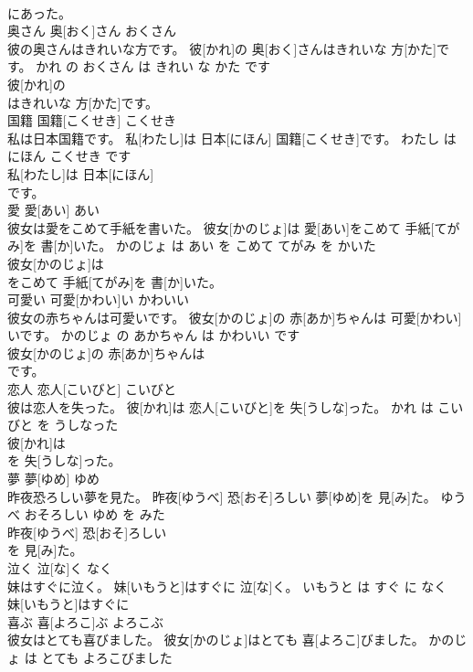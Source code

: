 \documentclass[8pt]{extreport}
\begin{document}
\begin{CJK}{UTF8}{min}
\\	にあった。			
\\	奥さん	奥[おく]さん	おくさん	
\\	彼の奥さんはきれいな方です。	彼[かれ]の 奥[おく]さんはきれいな 方[かた]です。	かれ の おくさん は きれい な かた です	
\\	彼[かれ]の
\\	はきれいな 方[かた]です。			
\\	国籍	国籍[こくせき]	こくせき	
\\	私は日本国籍です。	私[わたし]は 日本[にほん] 国籍[こくせき]です。	わたし は にほん こくせき です	
\\	私[わたし]は 日本[にほん]
\\	です。			
\\	愛	愛[あい]	あい	
\\	彼女は愛をこめて手紙を書いた。	彼女[かのじょ]は 愛[あい]をこめて 手紙[てがみ]を 書[か]いた。	かのじょ は あい を こめて てがみ を かいた	
\\	彼女[かのじょ]は
\\	をこめて 手紙[てがみ]を 書[か]いた。			
\\	可愛い	可愛[かわい]い	かわいい	
\\	彼女の赤ちゃんは可愛いです。	彼女[かのじょ]の 赤[あか]ちゃんは 可愛[かわい]いです。	かのじょ の あかちゃん は かわいい です	
\\	彼女[かのじょ]の 赤[あか]ちゃんは
\\	です。			
\\	恋人	恋人[こいびと]	こいびと	
\\	彼は恋人を失った。	彼[かれ]は 恋人[こいびと]を 失[うしな]った。	かれ は こいびと を うしなった	
\\	彼[かれ]は
\\	を 失[うしな]った。			
\\	夢	夢[ゆめ]	ゆめ	
\\	昨夜恐ろしい夢を見た。	昨夜[ゆうべ] 恐[おそ]ろしい 夢[ゆめ]を 見[み]た。	ゆうべ おそろしい ゆめ を みた	
\\	昨夜[ゆうべ] 恐[おそ]ろしい
\\	を 見[み]た。			
\\	泣く	泣[な]く	なく	
\\	妹はすぐに泣く。	妹[いもうと]はすぐに 泣[な]く。	いもうと は すぐ に なく	
\\	妹[いもうと]はすぐに
\\	喜ぶ	喜[よろこ]ぶ	よろこぶ	
\\	彼女はとても喜びました。	彼女[かのじょ]はとても 喜[よろこ]びました。	かのじょ は とても よろこびました	

\end{CJK}
\end{document}
